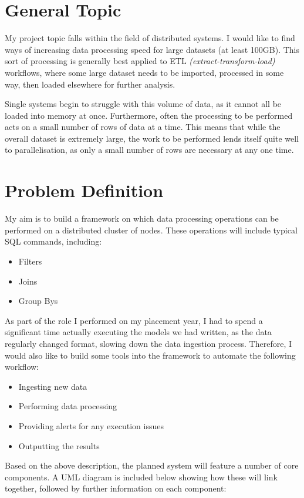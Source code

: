 \documentclass[12pt]{article}
\begin{document}
	\maketitle
	
	\section{General Topic}
	
	My project topic falls within the field of distributed systems. I would like to find ways of increasing data processing speed for large datasets (at least 100GB). This sort of processing is generally best applied to ETL \textit{(extract-transform-load)} workflows, where some large dataset needs to be imported, processed in some way, then loaded elsewhere for further analysis. \medskip
	
	Single systems begin to struggle with this volume of data, as it cannot all be loaded into memory at once. Furthermore, often the processing to be performed acts on a small number of rows of data at a time. This means that while the overall dataset is extremely large, the work to be performed lends itself quite well to parallelisation, as only a small number of rows are necessary at any one time.
	
	\section{Problem Definition}
	
	My aim is to build a framework on which data processing operations can be performed on a distributed cluster of nodes. These operations will include typical SQL commands, including:
	\begin{itemize}
		\item Filters
		\item Joins
		\item Group Bys
	\end{itemize}

	As part of the role I performed on my placement year, I had to spend a significant time actually executing the models we had written, as the data regularly changed format, slowing down the data ingestion process. Therefore, I would also like to build some tools into the framework to automate the following workflow:
	\begin{itemize}
		\item Ingesting new data
		\item Performing data processing
		\item Providing alerts for any execution issues
		\item Outputting the results
	\end{itemize}
	Based on the above description, the planned system will feature a number of core components. A UML diagram is included below showing how these will link together, followed by further information on each component:
	
\end{document}
